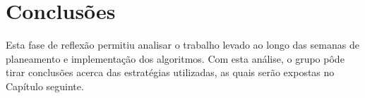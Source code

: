 \section{Conclusões}
\label{sec::reflexao:conclusao}

Esta fase de reflexão permitiu analisar o trabalho levado ao longo das semanas de planeamento e implementação dos algoritmos. Com esta análise, o grupo pôde tirar conclusões acerca das estratégias utilizadas, as quais serão expostas no Capítulo seguinte.

